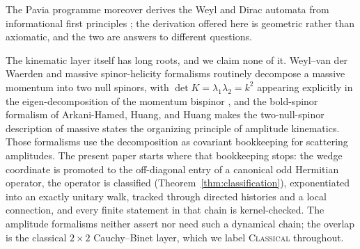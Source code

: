 \documentclass[11pt]{article}
\newcommand{\Classical}{\textcolor{classicalcolor}{\textsc{Classical}}}
\begin{document}
The Pavia programme moreover derives the Weyl and Dirac automata from
informational first principles \cite{FreeQCA}; the derivation offered here
is geometric rather than axiomatic, and the two are answers to different
questions.

The kinematic layer itself has long roots, and we claim none of it.
Weyl--van der Waerden and massive spinor-helicity formalisms routinely
decompose a massive momentum into two null spinors, with
$\det K=\lambda_1\lambda_2=k^2$ appearing explicitly in the
eigen-decomposition of the momentum bispinor \cite{DittmaierWvdW}, and the
bold-spinor formalism of Arkani-Hamed, Huang, and Huang
\cite{ArkaniHamedMassive} makes the two-null-spinor description of massive
states the organizing principle of amplitude kinematics.  Those formalisms
use the decomposition as covariant bookkeeping for scattering amplitudes.
The present paper starts where that bookkeeping stops: the wedge coordinate
is promoted to the off-diagonal entry of a canonical odd Hermitian operator,
the operator is classified (Theorem~\ref{thm:classification}), exponentiated
into an exactly unitary walk, tracked through directed histories and a local
connection, and every finite statement in that chain is kernel-checked.  The
amplitude formalisms neither assert nor need such a dynamical chain; the
overlap is the classical $2\times2$ Cauchy--Binet layer, which we label
\Classical{} throughout.
\end{document}
